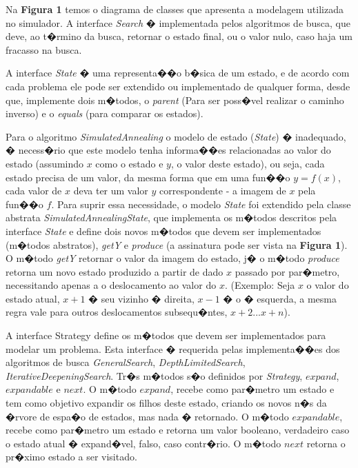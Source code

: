 \documentclass[12pt]{article}
\begin{document}
Na \textbf{Figura 1} temos o diagrama de classes que apresenta a modelagem utilizada no simulador. A interface \textit{Search} � implementada pelos algoritmos de busca, que deve, ao t�rmino da busca, retornar o estado final, ou o valor nulo, caso haja um fracasso na busca.

A interface \textit{State} � uma representa��o b�sica de um estado, e de acordo com cada problema ele pode ser extendido ou implementado de qualquer forma, desde que, implemente dois m�todos, o \textit{parent} (Para ser poss�vel realizar o caminho inverso) e o \textit{equals} (para comparar os estados). 

Para o algoritmo \textit{SimulatedAnnealing} o modelo de estado (\textit{State}) � inadequado, � necess�rio que este modelo tenha informa��es relacionadas ao valor do estado (assumindo $x$ como o estado e $y$, o valor deste estado), ou seja, cada estado precisa de um valor, da mesma forma que em uma fun��o $y = f(x)$, cada valor de $x$ deva ter um valor $y$ correspondente - a imagem de $x$ pela fun��o $f$. Para suprir essa necessidade, o modelo \textit{State} foi extendido pela classe abstrata \textit{SimulatedAnnealingState}, que implementa os m�todos descritos pela interface \textit{State} e define dois novos m�todos que devem ser implementados (m�todos abstratos), \textit{getY} e \textit{produce} (a assinatura pode ser vista na \textbf{Figura 1}). O m�todo \textit{getY} retornar o valor da imagem do estado, j� o m�todo \textit{produce} retorna um novo estado produzido a partir de dado $x$ passado por par�metro, necessitando apenas a o deslocamento ao valor do $x$. (Exemplo: Seja $x$ o valor do estado atual, $x+1$ � seu vizinho � direita, $x-1$ � o � esquerda, a mesma regra vale para outros deslocamentos subsequ�ntes, $x+2...x+n$).

A interface Strategy define os m�todos que devem ser implementados para modelar um problema. Esta interface � requerida pelas implementa��es dos algoritmos de busca \textit{GeneralSearch}, \textit{DepthLimitedSearch}, \textit{IterativeDeepeningSearch}. Tr�s m�todos s�o definidos por \textit{Strategy}, $expand$, $expandable$ e $next$. O m�todo $expand$, recebe como par�metro um estado e tem como objetivo expandir os filhos deste estado, criando os novos n�s da �rvore de espa�o de estados, mas nada � retornado. O m�todo $expandable$, recebe como par�metro um estado e retorna um valor booleano, verdadeiro caso o estado atual � expand�vel, falso, caso contr�rio. O m�todo $next$ retorna o pr�ximo estado a ser visitado.
\end{document}
